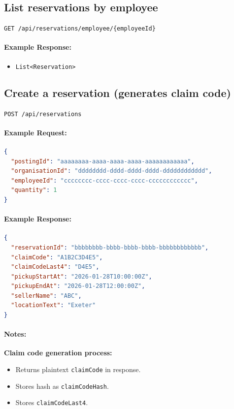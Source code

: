 \documentclass[a4paper,11pt]{article}
\begin{document}
\subsection{List reservations by employee}
\texttt{GET /api/reservations/employee/\{employeeId\}}

\paragraph{Example Response:}
\begin{itemize}
    \item \texttt{List<Reservation>}
\end{itemize}

\subsection{Create a reservation (generates claim code)}
\texttt{POST /api/reservations}

\paragraph{Example Request:}
\begin{lstlisting}[language=json]
{
  "postingId": "aaaaaaaa-aaaa-aaaa-aaaa-aaaaaaaaaaaa",
  "organisationId": "dddddddd-dddd-dddd-dddd-dddddddddddd",
  "employeeId": "cccccccc-cccc-cccc-cccc-cccccccccccc",
  "quantity": 1
}
\end{lstlisting}

\paragraph{Example Response:}
\begin{lstlisting}[language=json]
{
  "reservationId": "bbbbbbbb-bbbb-bbbb-bbbb-bbbbbbbbbbbb",
  "claimCode": "A1B2C3D4E5",
  "claimCodeLast4": "D4E5",
  "pickupStartAt": "2026-01-28T10:00:00Z",
  "pickupEndAt": "2026-01-28T12:00:00Z",
  "sellerName": "ABC",
  "locationText": "Exeter"
}
\end{lstlisting}

\paragraph{Notes:}
\textbf{Claim code generation process:}
\begin{itemize}
    \item Returns plaintext \texttt{claimCode} in response.
    \item Stores hash as \texttt{claimCodeHash}.
    \item Stores \texttt{claimCodeLast4}.
\end{itemize}
\end{document}
